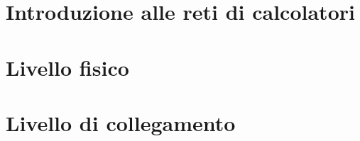 \documentclass[10pt]{article}
\begin{document}
    \section{Introduzione alle reti di calcolatori}
    

    \section{Livello fisico}
    

    \section{Livello di collegamento}
    
    
\end{document}
